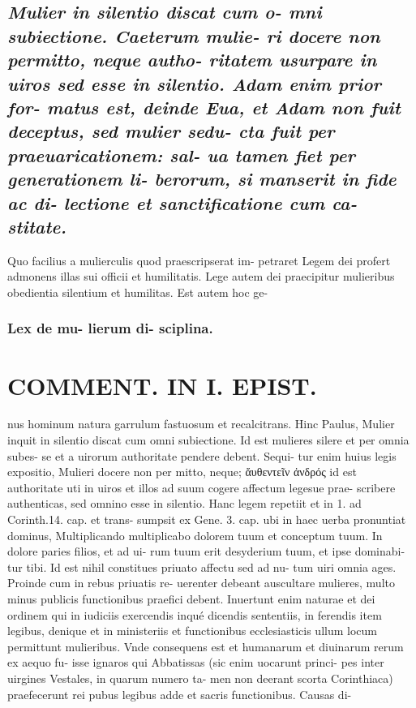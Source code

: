 \documentclass{article}
\begin{document}
\begin{pages}
\subsection*{\textit{Mulier in silentio discat cum o- mni subiectione. Caeterum mulie- ri docere non permitto, neque autho- ritatem usurpare in uiros sed esse in silentio. Adam enim prior for- matus est, deinde Eua, et Adam non fuit deceptus, sed mulier sedu- cta fuit per praeuaricationem: sal- ua tamen fiet per generationem li- berorum, si manserit in fide ac di- lectione et sanctificatione cum ca- stitate. }}\pstart Quo facilius a mulierculis quod praescripserat im- petraret Legem dei profert admonens illas sui officii et humilitatis. Lege autem dei praecipitur mulieribus obedientia silentium et humilitas. Est autem hoc ge-  \pend
\subsubsection*{Lex de mu- lierum di- sciplina. }
\section*{COMMENT. IN I. EPIST. }\pstart nus hominum natura garrulum fastuosum et recalcitrans. Hinc Paulus, Mulier inquit in silentio discat cum omni subiectione. Id est mulieres silere et per omnia subes- se et a uirorum authoritate pendere debent. Sequi- tur enim huius legis expositio, Mulieri docere non per mitto, neque; ἄυθεντεῖν ἀνδρός id est authoritate uti in uiros et illos ad suum cogere affectum legesue prae- scribere authenticas, sed omnino esse in silentio. Hanc legem repetiit et in 1. ad Corinth.14. cap. et trans- sumpsit ex Gene. 3. cap. ubi in haec uerba pronuntiat dominus, Multiplicando multiplicabo dolorem tuum et conceptum tuum. In dolore paries filios, et ad ui- rum tuum erit desyderium tuum, et ipse dominabi- tur tibi. Id est nihil constitues priuato affectu sed ad nu- tum uiri omnia ages. Proinde cum in rebus priuatis re- uerenter debeant auscultare mulieres, multo minus publicis functionibus praefici debent. Inuertunt enim naturae et dei ordinem qui in iudiciis exercendis inqué dicendis sententiis, in ferendis item legibus, denique et in ministeriis et functionibus ecclesiasticis ullum locum permittunt mulieribus. Vnde consequens est et humanarum et diuinarum rerum ex aequo fu- isse ignaros qui Abbatissas (sic enim uocarunt princi- pes inter uirgines Vestales, in quarum numero ta- men non deerant scorta Corinthiaca) praefecerunt rei pubus  legibus adde et sacris functionibus. Causas di-  \pend

\end{pages}
\end{document}
